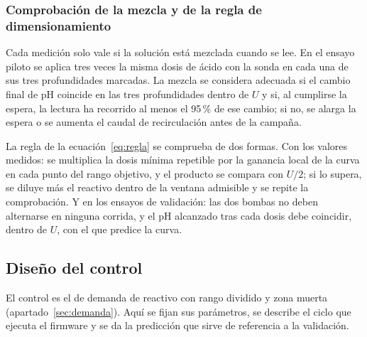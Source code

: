 \subsubsection{Comprobación de la mezcla y de la regla de dimensionamiento}\label{sec:comprobacion}
Cada medición solo vale si la solución está mezclada cuando se lee. En el ensayo piloto se aplica tres veces la misma dosis de ácido con la sonda en cada una de sus tres profundidades marcadas. La mezcla se considera adecuada si el cambio final de pH coincide en las tres profundidades dentro de $U$ y si, al cumplirse la espera, la lectura ha recorrido al menos el 95\,\% de ese cambio; si no, se alarga la espera o se aumenta el caudal de recirculación antes de la campaña.

La regla de la ecuación~\eqref{eq:regla} se comprueba de dos formas. Con los valores medidos: se multiplica la dosis mínima repetible por la ganancia local de la curva en cada punto del rango objetivo, y el producto se compara con $U/2$; si lo supera, se diluye más el reactivo dentro de la ventana admisible y se repite la comprobación. Y en los ensayos de validación: las dos bombas no deben alternarse en ninguna corrida, y el pH alcanzado tras cada dosis debe coincidir, dentro de $U$, con el que predice la curva.

\subsection{Diseño del control}\label{sec:control}

El control es el de demanda de reactivo con rango dividido y zona muerta (apartado~\ref{sec:demanda}). Aquí se fijan sus parámetros, se describe el ciclo que ejecuta el firmware y se da la predicción que sirve de referencia a la validación.

